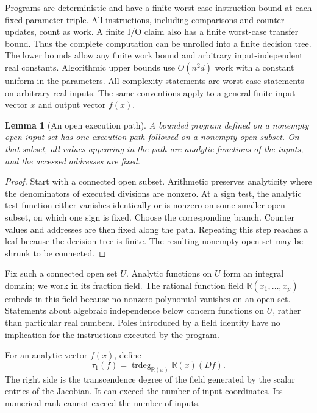 \documentclass[11pt]{article}
\newtheorem{lemma}[lemma]{Lemma}
\theoremstyle{definition}
\theoremstyle{remark}
\newcommand{\R}{\mathbb R}
\newcommand{\trdeg}{\operatorname{trdeg}}
\begin{document}
Programs are deterministic and have a finite worst-case instruction
bound at each fixed parameter triple. All instructions, including
comparisons and counter updates, count as work. A finite I/O claim also
has a finite worst-case transfer bound. Thus the complete computation
can be unrolled into a finite decision tree. The lower bounds allow
any finite work bound and arbitrary input-independent real constants.
Algorithmic upper bounds use $O(n^2d)$ work with a constant uniform in
the parameters. All complexity statements are worst-case statements
on arbitrary real inputs. The same conventions apply to a general
finite input vector $x$ and output vector $f(x)$.

\begin{lemma}[An open execution path]
\label{lem:open}
A bounded program defined on a nonempty open input set has one
execution path followed on a nonempty open subset. On that subset,
all values appearing in the path are analytic functions of the inputs,
and the accessed addresses are fixed.
\end{lemma}
\begin{proof}
Start with a connected open subset. Arithmetic preserves analyticity
where the denominators of executed divisions are nonzero. At a sign
test, the analytic test function either vanishes identically or is
nonzero on some smaller open subset, on which one sign is fixed.
Choose the corresponding branch. Counter values and addresses are
then fixed along the path. Repeating this step reaches a leaf because
the decision tree is finite. The resulting nonempty open set may be
shrunk to be connected.
\end{proof}

Fix such a connected open set $U$. Analytic functions on $U$ form an
integral domain; we work in its fraction field. The rational function
field $\R(x_1,\ldots,x_p)$ embeds in this field because no nonzero
polynomial vanishes on an open set. Statements about algebraic
independence below concern functions on $U$, rather than particular
real numbers. Poles introduced by a field identity have no implication
for the instructions executed by the program.

For an analytic vector $f(x)$, define
\begin{equation}
 \tau_1(f)=\trdeg_{\R(x)}\R(x)(Df).
 \label{eq:tau}
\end{equation}
The right side is the transcendence degree of the field generated by
the scalar entries of the Jacobian. It can exceed the number of input
coordinates. Its numerical rank cannot exceed the number of inputs.
\end{document}
